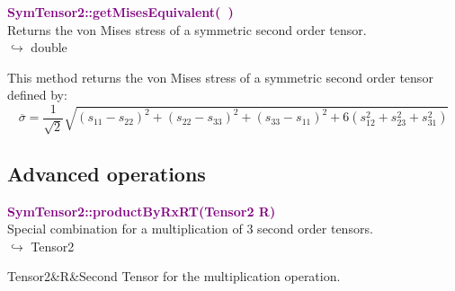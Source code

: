 \textcolor{purple}{\textbf{SymTensor2::getMisesEquivalent(~)}}\label{SymTensor2::getMisesEquivalent()}\\
Returns the von Mises stress of a symmetric second order tensor.\\ \hspace*{10mm}$\hookrightarrow$ double

This method returns the von Mises stress of a symmetric second order tensor defined by:
\begin{equation*}
\overline{\sigma} = \frac {1}{\sqrt{2}}\sqrt{(s_{11}-s_{22})^2+(s_{22}-s_{33})^2+(s_{33}-s_{11})^2+6(s_{12}^2+s_{23}^2+s_{31}^2)}
\end{equation*}

\subsection{Advanced operations}

\textcolor{purple}{\textbf{SymTensor2::productByRxRT(Tensor2 R)}}\label{SymTensor2::productByRxRT(Tensor2 R)}\\
Special combination for a multiplication of 3 second order tensors.\\ \hspace*{10mm}$\hookrightarrow$ Tensor2

\begin{tcolorbox}[width=\textwidth,myArgs,tabularx={ll|R}]
Tensor2&R&Second Tensor for the multiplication operation.
\end{tcolorbox}

